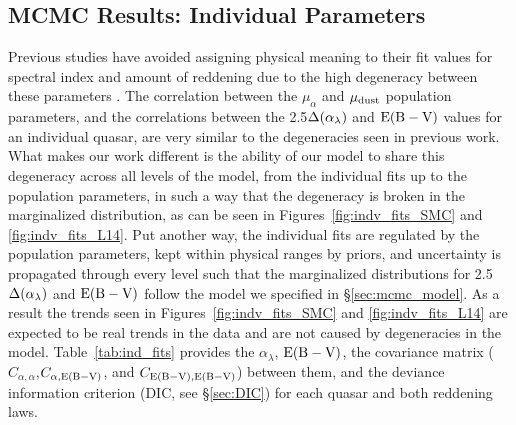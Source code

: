 

\subsection{MCMC Results: Individual Parameters} \label{sec:mcmc_ip}

Previous studies \citep[i.e.,][]{Reichard:2003a,Reichard:2003b} have avoided assigning physical meaning to their fit values for spectral index and amount of reddening due to the high degeneracy between these parameters \citep[e.g., Figure 3 of ][]{Reichard:2003a}. The correlation between the $\mu_{\alpha}$ and $\mu_{\rm dust}$ population parameters, and the correlations between the 2.5$\Delta(\alpha_{\lambda})$ and ${\rm E(B-V)}$ values for an individual quasar, are very similar to the degeneracies seen in previous work.  What makes our work different is the ability of our model to share this degeneracy across all levels of the model, from the individual fits up to the population parameters, in such a way that the degeneracy is broken in the marginalized distribution, as can be seen in Figures~\ref{fig:indv_fits_SMC} and \ref{fig:indv_fits_L14}. Put another way, the individual fits are regulated by the population parameters, kept within physical ranges by priors, and uncertainty is propagated through every level such that the marginalized distributions for 2.5$\Delta(\alpha_{\lambda})$ and ${\rm E(B-V)}$ follow the model we specified in \S\ref{sec:mcmc_model}.
As a result the trends seen in Figures~\ref{fig:indv_fits_SMC} and \ref{fig:indv_fits_L14} are expected to be real trends in the data and are not caused by degeneracies in the model.  Table~\ref{tab:ind_fits} provides the $\alpha_{\lambda}$, ${\rm E(B-V)}$, the covariance matrix ($C_{\alpha,\alpha}$,$C_{\alpha,{\rm E(B-V)}}$, and $C_{{\rm E(B-V)},{\rm E(B-V)}}$) between them, and the deviance information criterion (DIC, see \S\ref{sec:DIC}) for each quasar and both reddening laws.

